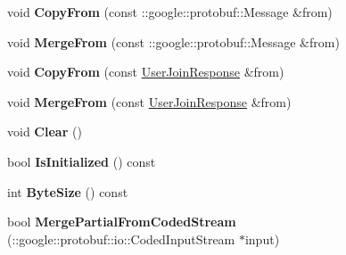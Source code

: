 \begin{DoxyCompactItemize}
\item 
\hypertarget{classSimpleChat_1_1UserJoinResponse_a294fddc7967202fa7900aab998eceb81}{void {\bfseries Copy\-From} (const \-::google\-::protobuf\-::\-Message \&from)}\label{classSimpleChat_1_1UserJoinResponse_a294fddc7967202fa7900aab998eceb81}

\item 
\hypertarget{classSimpleChat_1_1UserJoinResponse_ac83c9115a5c0cd55e0347fcc3ab4b2a3}{void {\bfseries Merge\-From} (const \-::google\-::protobuf\-::\-Message \&from)}\label{classSimpleChat_1_1UserJoinResponse_ac83c9115a5c0cd55e0347fcc3ab4b2a3}

\item 
\hypertarget{classSimpleChat_1_1UserJoinResponse_ac31245541435fbfd50017fdb4641fc92}{void {\bfseries Copy\-From} (const \hyperlink{classSimpleChat_1_1UserJoinResponse}{User\-Join\-Response} \&from)}\label{classSimpleChat_1_1UserJoinResponse_ac31245541435fbfd50017fdb4641fc92}

\item 
\hypertarget{classSimpleChat_1_1UserJoinResponse_a3a496db84f7ecbcb2daa5430dfae8849}{void {\bfseries Merge\-From} (const \hyperlink{classSimpleChat_1_1UserJoinResponse}{User\-Join\-Response} \&from)}\label{classSimpleChat_1_1UserJoinResponse_a3a496db84f7ecbcb2daa5430dfae8849}

\item 
\hypertarget{classSimpleChat_1_1UserJoinResponse_a578bc5bc15322ac410d9f8a0054009d3}{void {\bfseries Clear} ()}\label{classSimpleChat_1_1UserJoinResponse_a578bc5bc15322ac410d9f8a0054009d3}

\item 
\hypertarget{classSimpleChat_1_1UserJoinResponse_ac69e0bc7f005430285db03b4e1d94929}{bool {\bfseries Is\-Initialized} () const }\label{classSimpleChat_1_1UserJoinResponse_ac69e0bc7f005430285db03b4e1d94929}

\item 
\hypertarget{classSimpleChat_1_1UserJoinResponse_a7bc9bfc4416d0518e5f56ab724aa8402}{int {\bfseries Byte\-Size} () const }\label{classSimpleChat_1_1UserJoinResponse_a7bc9bfc4416d0518e5f56ab724aa8402}

\item 
\hypertarget{classSimpleChat_1_1UserJoinResponse_a7dcbfc3c35fb11afabea982e9e0ff766}{bool {\bfseries Merge\-Partial\-From\-Coded\-Stream} (\-::google\-::protobuf\-::io\-::\-Coded\-Input\-Stream $\ast$input)}\label{classSimpleChat_1_1UserJoinResponse_a7dcbfc3c35fb11afabea982e9e0ff766}


\end{DoxyCompactItemize}
